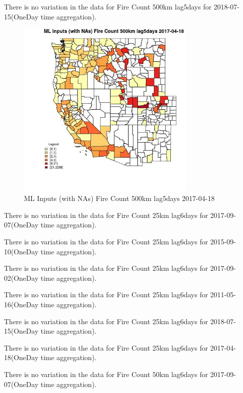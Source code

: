 There is no variation in the data for Fire Count 500km lag5days for 2018-07-15(OneDay time aggregation). 
 

\begin{figure} 
\centering  
\includegraphics[width=0.77\textwidth]{Code_Outputs/Report_ML_input_PM25_Step4_part_e_de_duplicated_aves_compiled_2019-05-21wNAs_CountyFire_Count_500km_lag5daysMean2017-04-18.jpg} 
\caption{\label{fig:Report_ML_input_PM25_Step4_part_e_de_duplicated_aves_compiled_2019-05-21wNAsCountyFire_Count_500km_lag5daysMean2017-04-18}ML Inputs (with NAs) Fire Count 500km lag5days 2017-04-18} 
\end{figure} 
 

There is no variation in the data for Fire Count 25km lag6days for 2017-09-07(OneDay time aggregation). 
 

There is no variation in the data for Fire Count 25km lag6days for 2015-09-10(OneDay time aggregation). 
 

There is no variation in the data for Fire Count 25km lag6days for 2017-09-02(OneDay time aggregation). 
 

There is no variation in the data for Fire Count 25km lag6days for 2011-05-16(OneDay time aggregation). 
 

There is no variation in the data for Fire Count 25km lag6days for 2018-07-15(OneDay time aggregation). 
 

There is no variation in the data for Fire Count 25km lag6days for 2017-04-18(OneDay time aggregation). 
 

There is no variation in the data for Fire Count 50km lag6days for 2017-09-07(OneDay time aggregation). 
 

